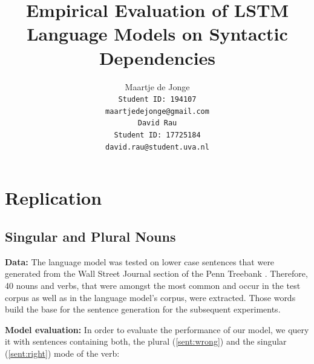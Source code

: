 \documentclass[11pt,a4paper]{article}
\title{Empirical Evaluation of LSTM Language Models \bigskip
on Syntactic Dependencies}
\author{
Maartje de Jonge\\
\tt Student ID: 194107\\
{\tt maartjedejonge@gmail.com} \\\And
David Rau \\
\tt Student ID: 17725184\\
{\tt david.rau@student.uva.nl} \\}
\date{}
\begin{document}
\maketitle














\section{Replication}
\label{replication}

\subsection{Singular and Plural Nouns}

\textbf{Data:} 
The language model was tested on lower case sentences that were generated from the Wall Street Journal section of the Penn Treebank \citep{Marcus1993}. Therefore, 40 nouns and verbs, that were amongst the most common and occur in the test corpus as well as in the language model's corpus, were extracted. Those words build the base for the sentence generation for the subsequent experiments. 

\textbf{Model evaluation:} In order to evaluate the performance of our model, we query it with sentences containing both, the plural (\ref{sent:wrong}) and the singular (\ref{sent:right}) mode of the verb: 
\end{document}
